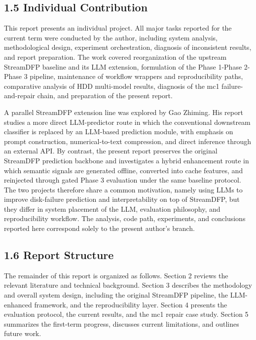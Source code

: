 \documentclass[
  11pt,
  a4paper]{article}
\begin{document}
\hypertarget{individual-contribution}{%
\subsection{1.5 Individual Contribution}\label{individual-contribution}}

This report presents an individual project. All major tasks reported for
the current term were conducted by the author, including system
analysis, methodological design, experiment orchestration, diagnosis of
inconsistent results, and report preparation. The work covered
reorganization of the upstream StreamDFP baseline and its LLM extension,
formulation of the Phase 1-Phase 2-Phase 3 pipeline, maintenance of
workflow wrappers and reproducibility paths, comparative analysis of HDD
multi-model results, diagnosis of the mc1 failure-and-repair chain, and
preparation of the present report.

A parallel StreamDFP extension line was explored by Gao Zhiming. His
report studies a more direct LLM-predictor route in which the
conventional downstream classifier is replaced by an LLM-based
prediction module, with emphasis on prompt construction,
numerical-to-text compression, and direct inference through an external
API. By contrast, the present report preserves the original StreamDFP
prediction backbone and investigates a hybrid enhancement route in which
semantic signals are generated offline, converted into cache features,
and reinjected through gated Phase 3 evaluation under the same baseline
protocol. The two projects therefore share a common motivation, namely
using LLMs to improve disk-failure prediction and interpretability on
top of StreamDFP, but they differ in system placement of the LLM,
evaluation philosophy, and reproducibility workflow. The analysis, code
path, experiments, and conclusions reported here correspond solely to
the present author's branch.

\hypertarget{report-structure}{%
\subsection{1.6 Report Structure}\label{report-structure}}

The remainder of this report is organized as follows. Section 2 reviews
the relevant literature and technical background. Section 3 describes
the methodology and overall system design, including the original
StreamDFP pipeline, the LLM-enhanced framework, and the reproducibility
layer. Section 4 presents the evaluation protocol, the current results,
and the mc1 repair case study. Section 5 summarizes the first-term
progress, discusses current limitations, and outlines future work.
\end{document}
